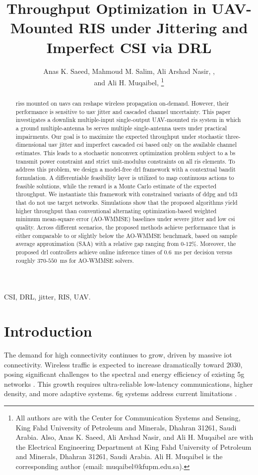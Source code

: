 \documentclass[letterpaper,journal]{IEEEtran}
\title{Throughput Optimization in UAV-Mounted RIS under Jittering and Imperfect CSI via DRL}
\author{\IEEEauthorblockN{}
\IEEEauthorblockA{
Department of Electrical Engineering, King Fahd University of Petroleum and Minerals}}
\author{Anas K. Saeed, Mahmoud M. Salim, Ali Arshad Nasir, \IEEEmembership{Senior Member, IEEE}, \\
and Ali H. Muqaibel,
\IEEEmembership{Senior Member, IEEE}        %
\thanks{All authors are with the Center for Communication Systems and Sensing, King Fahd University of Petroleum and Minerals, Dhahran 31261, Saudi Arabia. Also, Anas K. Saeed, Ali Arshad Nasir, and Ali H. Muqaibel are with the Electrical Engineering Department at King Fahd University of Petroleum and Minerals, Dhahran 31261, Saudi Arabia. Ali H. Muqaibel is the corresponding author (email: muqaibel@kfupm.edu.sa).}}
\begin{document}

\maketitle

\begin{abstract}
\Glspl{ris} mounted on \glspl{uav} can reshape wireless propagation on-demand. However, their performance is sensitive to \gls{uav} jitter and cascaded channel uncertainty. This paper investigates a downlink multiple-input single-output UAV-mounted \gls{ris} system in which a ground multiple-antenna \gls{bs} serves multiple single-antenna users under practical impairments. Our goal is to maximize the expected throughput under stochastic three-dimensional \gls{uav} jitter and imperfect cascaded \gls{csi} based only on the available channel estimates. This leads to a stochastic nonconvex optimization problem subject to a \gls{bs} transmit power constraint and strict unit-modulus constraints on all \gls{ris} elements. To address this problem, we design a model-free \gls{drl} framework with a contextual bandit formulation. A differentiable feasibility layer is utilized to map continuous actions to feasible solutions, while the reward is a Monte Carlo estimate of the expected throughput. We instantiate this framework with constrained variants of \gls{ddpg} and \gls{td3} that do not use target networks. Simulations show that the proposed algorithms yield higher throughput than conventional alternating optimization-based weighted minimum mean-square error (AO-WMMSE) baselines under severe jitter and low \gls{csi} quality. Across different scenarios, the proposed methods achieve performance that is either comparable to or slightly below the AO-WMMSE benchmark, based on sample average approximation (SAA) with a relative gap ranging from $0$-$12\%$. Moreover, the proposed \gls{drl} controllers achieve online inference times of $0.6$~ms per decision versus roughly $370$-$550$~ms for AO-WMMSE solvers.
\end{abstract}

\begin{IEEEkeywords}
CSI, DRL, jitter, RIS, UAV.
\end{IEEEkeywords}

 
\glsresetall

\section{Introduction}
The demand for high connectivity continues to grow, driven by massive \gls{iot} connectivity. Wireless traffic is expected to increase dramatically toward 2030, posing significant challenges to the spectral and energy efficiency of existing \gls{5g} networks \cite{wei2023integrated}. This growth requires ultra-reliable low-latency communications, higher density, and more adaptive systems. \Gls{6g} systems address current limitations \cite{david20186g}.
\end{document}
